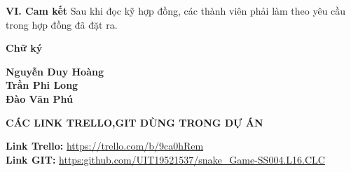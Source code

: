 \documentclass{article}
\begin{document}
\begin{flushleft}
\begin{tabular}{|>{\raggedright\arraybackslash}p{4cm}
|>{\raggedright\arraybackslash}p{4cm}
|>{\raggedright\arraybackslash}p{4cm}
|>{\raggedright\arraybackslash}p{4cm}
|>{\raggedright\arraybackslash}p{4cm}|}
\end{tabular}
\textbf{\large VI. Cam kết}
Sau khi đọc kỹ hợp đồng, các thành viên phải làm theo yêu cầu trong hợp đồng đã đặt ra.
\newpage
\begin{center}
    \textbf{\Large Chữ ký}
\end{center}
\textbf{Nguyễn Duy Hoàng}\\
\textbf{Trần Phi Long}\\
\textbf{Đào Văn Phú}
\end{flushleft}


\begin{center}
  \textbf{\Large CÁC LINK TRELLO,GIT DÙNG TRONG DỰ ÁN}
\end{center}
\textbf{Link Trello:}
\url{https://trello.com/b/9ca0hRem}\\
\textbf{Link GIT:}
\url{https:github.com/UIT19521537/snake_Game-SS004.L16.CLC}
\end{document}
